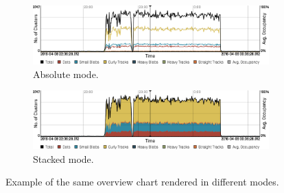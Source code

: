 \begin{figure}[t]
\begin{center}

	\begin{subfigure}{\textwidth}
	\includegraphics[width=\textwidth]{figures/overview-absolute}
	\caption{Absolute mode.}
	\label{fig:overview-chart-absolute}
	\end{subfigure}

	\vspace{0.2cm}

	\begin{subfigure}{\textwidth}
	\includegraphics[width=\textwidth]{figures/overview-stacked}
	\caption{Stacked mode.}
	\label{fig:overview-chart-stacked}
	\end{subfigure}

\caption[Comparison of overview rendering modes.]{Example of the same overview chart rendered in different modes.}
\label{fig:overview-chart-modes}
\end{center}
\end{figure}

